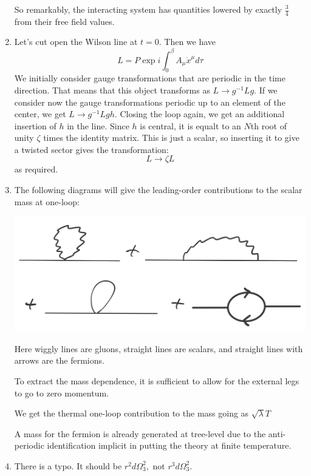 \documentclass[11pt, class=article, crop=false]{standalone}
\begin{document}
\begin{enumerate}
	
	So remarkably, the interacting system has quantities lowered by exactly $\frac34$ from their free field values. 
	
	\item Let's cut open the Wilson line at $t=0$. Then we have 
	\[
		L = P \exp i \int_0^\beta A_\mu \dot x^\mu d\tau
	\]
	We initially consider gauge transformations that are periodic in the time direction. That means that this object transforms as $L \to g^{-1} L g$. If we consider now the gauge transformations periodic up to an element of the center, we get $L \to g^{-1} L g h$. Closing the loop again, we get an additional insertion of $h$ in the line. Since $h$ is central, it is equalt to an $N$th root of unity $\zeta$ times the identity matrix. This is just a scalar, so inserting it to give a twisted sector gives the transformation:
	\[
		L \to \zeta L
	\]
	as required. 
	
	\item The following diagrams will give the leading-order contributions to the scalar mass at one-loop:
	
	\begin{center}
		\includegraphics[scale=0.3]{"Drawings/Thermal Mass"}
	\end{center}
	Here wiggly lines are gluons, straight lines are scalars, and straight lines with arrows are the fermions. 
	
	To extract the mass dependence, it is sufficient to allow for the external legs to go to zero momentum. 
	
	We get the thermal one-loop contribution to the mass going as $\sqrt{\lambda} T$
	
	A mass for the fermion is already generated at tree-level due to the anti-periodic identification implicit in putting the theory at finite temperature. 
	
	
	
	\item There is a typo. It should be $r^2 d\Omega_3^2,$ not $r^3 d\Omega_3^2$.
	

\end{enumerate}
\end{document}
